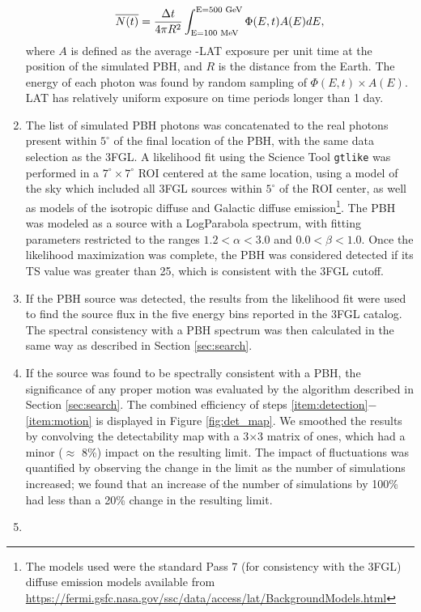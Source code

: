 \begin{enumerate}
\noindent
\begin{equation}
\overline{N(t)} = \frac{ \Delta t}{4\pi R^2}\int_{\textup{E=100 MeV}}^{\textup{E=500 GeV}} {\Phi(E,t)} A(E) dE,
\end{equation}
where $A$ is defined as the average \Fermi-LAT exposure per unit time at the position of the simulated PBH, and $R$ is the distance from the Earth.
The energy of each photon was found by random sampling of $\Phi(E,t)\times A(E)$. 
\Fermi LAT has relatively uniform exposure on time periods longer than 1 day.
\item
\label{item:detection}
The list of simulated PBH photons was concatenated to the real photons present within $5^\circ$ of the final location of the PBH, with the same data selection as the 3FGL. A likelihood fit using the \Fermi Science Tool {\tt gtlike} was performed in a $7^{\circ}\times7^{\circ}$ ROI centered at the same location, using a model of the sky which included all 3FGL sources within $5^\circ$ of the ROI center, as well as models of the isotropic diffuse and Galactic diffuse emission\footnote{The models used were the standard Pass 7 (for consistency with the 3FGL) diffuse emission models available from \url{https://fermi.gsfc.nasa.gov/ssc/data/access/lat/BackgroundModels.html}}. The PBH was modeled as a source with a LogParabola spectrum, with fitting parameters restricted to the ranges $1.2<\alpha<3.0$ and $0.0<\beta<1.0$. Once the likelihood maximization was complete, the PBH was considered detected if its TS value was greater than 25, which is consistent with the 3FGL cutoff.
\item
\label{item:spectrum}
If the PBH source was detected, the results from the likelihood fit were used to find the source flux in the five energy bins reported in the 3FGL catalog. The spectral consistency with a PBH spectrum was then calculated in the same way as described in Section \ref{sec:search}.
\item 
\label{item:motion}
If the source was found to be spectrally consistent with a PBH, the significance of any proper motion was evaluated by the algorithm described in Section \ref{sec:search}. The combined efficiency of steps \ref{item:detection}$-$\ref{item:motion} is displayed in Figure \ref{fig:det_map}. We smoothed the results by convolving the detectability map with a 3$\times$3 matrix of ones, which had a minor ($\approx$ 8\%) impact on the resulting limit. The impact of fluctuations was quantified by observing the change in the limit as the number of simulations increased; we found that an increase of the number of simulations by 100\% had less than a 20\% change in the resulting limit.
\item 


\end{enumerate}
